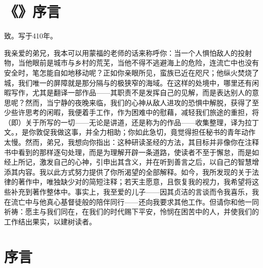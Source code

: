 
\section{《》序言}

致。写于410年。\par

我亲爱的弟兄，我本可以用蒙福的老师的话来称呼你：当一个人惧怕敌人的投射物，当他眼前是城市与乡村的荒芜，当他不得不逃避海上的危险，连流亡中也没有安全时，笔怎能自如地移动呢？正如你亲眼所见，蛮族已近在咫尺；他纵火焚烧了城，我们唯一的屏障就是那分隔与的极狭窄的海域。在这样的处境中，哪里还有闲暇写作，尤其是翻译一部作品——其职责不是发挥自己的见解，而是表达别人的意思呢？然而，当宁静的夜晚来临，我们的心神从敌人进攻的恐惧中解脱，获得了至少些许思考的闲暇，我便着手工作，作为困难中的慰藉，减轻我们旅途的重担，将（即）关于所写的一切——无论是讲道，还是称为的作品——收集整理，译为拉丁文。，是你敦促我做这事，并全力相助；你如此急切，竟觉得担任秘书的青年动作太慢。然而，弟兄，我想向你指出：这种研读圣经的方法，其目标并非像你在注释书中看到的那样逐句处理，而是为理解开辟一条道路，使读者不至于懈怠，而是如经上所记，激发自己的心神，引申出其含义，并在听到善言之后，以自己的智慧增添其内容。我以此方式努力提供了你所渴望的全部解释。如今，我所发现的关于法律的著作中，唯独缺少对的简短注释；若天主愿意，且恢复我的视力，我希望将这些补充到著作整体中。事实上，我至爱的儿子——因其贞洁的言谈而令我喜乐，我在流亡中与他真心基督徒般的陪伴同行——还向我要求其他工作。但请你和他一同祈祷：愿主与我们同在，在我们的时代赐下平安，怜悯在困苦中的人，并使我们的工作结出果实，以建树读者。\par


\section{序言}

